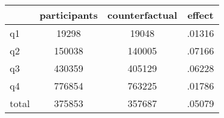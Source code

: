 \begin{table}[htbp]
\begin{tabular}{lccc} \hline \hline
 & participants  & counterfactual  & effect  \\  \hline 
q1 &     19298 &     19048 &    .01316 \\  
q2 &    150038 &    140005 &    .07166 \\  
q3 &    430359 &    405129 &    .06228 \\  
q4 &    776854 &    763225 &    .01786 \\  
total &    375853 &    357687 &    .05079 \\  
\hline \hline \end{tabular}
\end{table}
